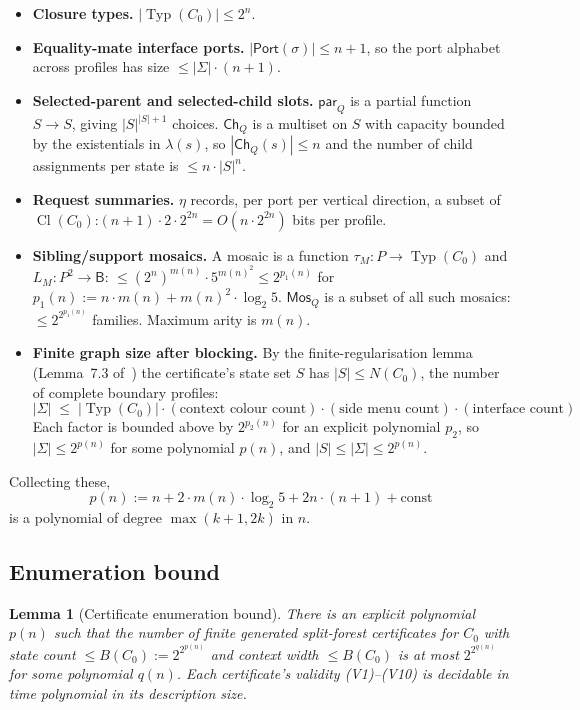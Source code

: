 \documentclass[11pt]{article}
\newtheorem{lemma}[theorem]{Lemma}
\newcommand{\Cl}{\operatorname{Cl}}
\newcommand{\Typ}{\operatorname{Typ}}
\newcommand{\Base}{\mathsf{B}}
\newcommand{\Port}{\mathsf{Port}}
\newcommand{\Mos}{\mathsf{Mos}}
\newcommand{\parr}{\mathsf{par}}
\begin{document}
\begin{itemize}[leftmargin=2em]
  \item \textbf{Closure types.}  \(|\Typ(C_0)| \le 2^n\).
  \item \textbf{Equality-mate interface ports.}
    \(|\Port(\sigma)| \le n + 1\), so the port alphabet across
    profiles has size \(\le |\Sigma| \cdot (n+1)\).
  \item \textbf{Selected-parent and selected-child slots.}
    \(\parr_Q\) is a partial function \(S \to S\), giving
    \(|S|^{|S| + 1}\) choices.  \(\mathsf{Ch}_Q\) is a multiset on
    \(S\) with capacity bounded by the existentials in \(\lambda(s)\),
    so \(|\mathsf{Ch}_Q(s)| \le n\) and the number of child
    assignments per state is \(\le n \cdot |S|^n\).
  \item \textbf{Request summaries.}
    \(\eta\) records, per port per vertical direction, a subset of
    \(\Cl(C_0)\):\@ \((n+1) \cdot 2 \cdot 2^{2n} = O(n \cdot 2^{2n})\)
    bits per profile.
  \item \textbf{Sibling/support mosaics.}  A mosaic is a function
    \(\tau_M : P \to \Typ(C_0)\) and \(L_M : P^2 \to \Base\):\@
    \(\le (2^n)^{m(n)} \cdot 5^{m(n)^2} \le 2^{p_1(n)}\) for
    \(p_1(n) := n \cdot m(n) + m(n)^2 \cdot \log_2 5\).
    \(\Mos_Q\) is a subset of all such mosaics:\@
    \(\le 2^{2^{p_1(n)}}\) families.  Maximum arity is
    \(m(n)\).
  \item \textbf{Finite graph size after blocking.}  By the
    finite-regularisation lemma (Lemma~7.3
    of~\cite{repaired}) the certificate's state set \(S\) has
    \(|S| \le N(C_0)\), the number of complete boundary profiles:
    \[
      |\Sigma| \;\le\; |\Typ(C_0)| \cdot (\text{context colour count})
        \cdot (\text{side menu count}) \cdot (\text{interface count})
    \]
    Each factor is bounded above by \(2^{p_2(n)}\) for an explicit
    polynomial \(p_2\), so \(|\Sigma| \le 2^{p(n)}\) for some
    polynomial \(p(n)\), and \(|S| \le |\Sigma| \le 2^{p(n)}\).
\end{itemize}

Collecting these,
\[
  p(n) := n + 2 \cdot m(n) \cdot \log_2 5 + 2n \cdot (n+1)
            + \text{const}
\]
is a polynomial of degree \(\max(k+1, 2k)\) in \(n\).

\subsection{Enumeration bound}

\begin{lemma}[Certificate enumeration bound]\label{lem:enumeration}
There is an explicit polynomial \(p(n)\) such that the number of
finite generated split-forest certificates for \(C_0\) with state
count \(\le B(C_0) := 2^{2^{p(n)}}\) and context width \(\le B(C_0)\)
is at most \(2^{2^{q(n)}}\) for some polynomial \(q(n)\).  Each
certificate's validity (V1)--(V10) is decidable in time polynomial
in its description size.
\end{lemma}
\end{document}
